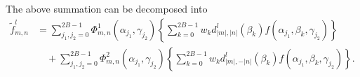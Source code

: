 \documentclass[onecolumn,11pt]{IEEEtran}
\begin{document}
The above summation can be decomposed into
\begin{align*}
    \tilde f^l_{m,n} & = \sum_{j_1,j_2=0}^{2B-1} \Phi^1_{m,n}(\alpha_{j_1},\gamma_{j_2}) \left\{ \sum_{k=0}^{2B-1} w_k d^l_{|m|,|n|}(\beta_k) f(\alpha_{j_1},\beta_k,\gamma_{j_2}) \right\}\\
                     & \quad + \sum_{j_1,j_2=0}^{2B-1} \Phi^2_{m,n}(\alpha_{j_1},\gamma_{j_2}) \left\{ \sum_{k=0}^{2B-1} w_k d^l_{|m|,-|n|}(\beta_k) f(\alpha_{j_1},\beta_k,\gamma_{j_2}) \right\}.
\end{align*}
% 




\end{document}
